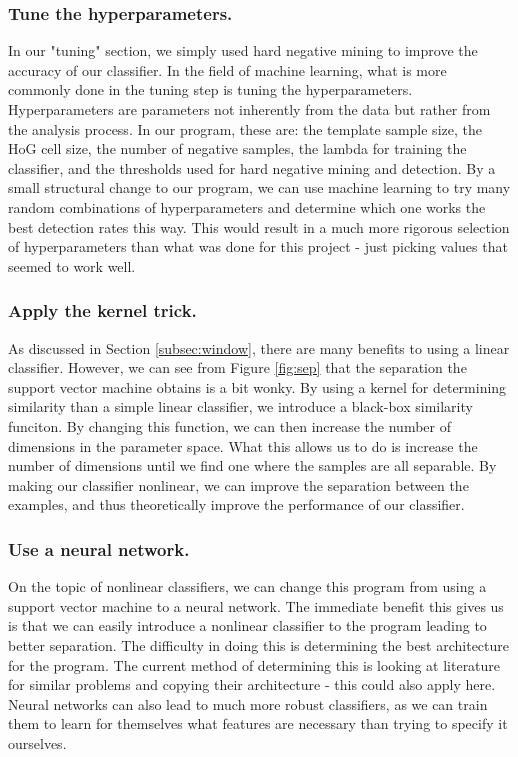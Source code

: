 \documentclass[twocolumn,longauthor]{aastex61}
\begin{document}
\subsubsection{Tune the hyperparameters.} \label{subsubsec:hyperparams}
\noindent In our "tuning" section, we simply used hard negative mining to improve the accuracy of our classifier. In the field of machine learning, what is more commonly done in the tuning step is tuning the hyperparameters. Hyperparameters are parameters not inherently from the data but rather from the analysis process. In our program, these are: the template sample size, the HoG cell size, the number of negative samples, the lambda for training the classifier, and the thresholds used for hard negative mining and detection. By a small structural change to our program, we can use machine learning to try many random combinations of hyperparameters and determine which one works the best detection rates this way. This would result in a much more rigorous selection of hyperparameters than what was done for this project - just picking values that seemed to work well.

\subsubsection{Apply the kernel trick.} \label{subsubsec:kernel}
\noindent As discussed in Section \ref{subsec:window}, there are many benefits to using a linear classifier. However, we can see from Figure \ref{fig:sep} that the separation the support vector machine obtains is a bit wonky. By using a kernel for determining similarity than a simple linear classifier, we introduce a black-box similarity funciton. By changing this function, we can then increase the number of dimensions in the parameter space. What this allows us to do is increase the number of dimensions until we find one where the samples are all separable. By making our classifier nonlinear, we can improve the separation between the examples, and thus theoretically improve the performance of our classifier.

\subsubsection{Use a neural network.} \label{subsubsec:nn}
\noindent On the topic of nonlinear classifiers, we can change this program from using a support vector machine to a neural network. The immediate benefit this gives us is that we can easily introduce a nonlinear classifier to the program leading to better separation. The difficulty in doing this is determining the best architecture for the program. The current method of determining this is looking at literature for similar problems and copying their architecture - this could also apply here. Neural networks can also lead to much more robust classifiers, as we can train them to learn for themselves what features are necessary than trying to specify it ourselves.
\end{document}
